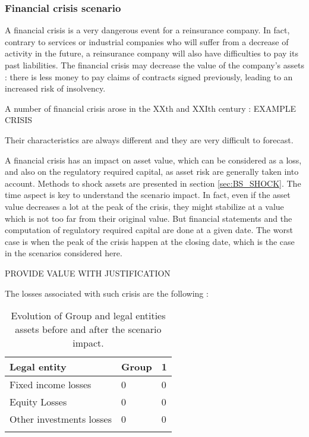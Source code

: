 
\subsubsection{Financial crisis scenario}

A financial crisis is a very dangerous event for a reinsurance company. In fact, contrary to services or industrial companies who will suffer from a decrease of activity in the future, a reinsurance company will also have difficulties to pay its past liabilities. The financial crisis may decrease the value of the company's assets : there is less money to pay claims of contracts signed previously, leading to an increased risk of insolvency. 

A number of financial crisis arose in the XXth and XXIth century : EXAMPLE CRISIS


Their characteristics are always different and they are very difficult to forecast. 


A financial crisis has an impact on asset value, which can be considered as a loss, and also on the regulatory required capital, as asset risk are generally taken into account. Methods to shock assets are presented in section \ref{sec:BS_SHOCK}. The time aspect is key to understand the scenario impact. In fact, even if the asset value decreases a lot at the peak of the crisis, they might stabilize at a value which is not too far from their original value. But financial statements and the computation of regulatory required capital are done at a given date. The worst case is when the peak of the crisis happen at the closing date, which is the case in the scenarios considered here.


PROVIDE VALUE WITH JUSTIFICATION


The losses associated with such crisis are  the following :

\begin{table}
\centering
\begin{tabular}{|l|l|l|}
\hline
   \textbf{Legal entity} & \textbf{Group} & \textbf{1} \\ \hline \hline
   Fixed income losses & 0 & 0 \\ \hline
   Equity Losses & 0 & 0 \\ \hline
   Other investments losses & 0 & 0 \\ \hline
   \label{t:FC_LOSS}
\end{tabular}
   \caption{Evolution of Group and legal entities assets before and after the scenario impact.}
\end{table}

